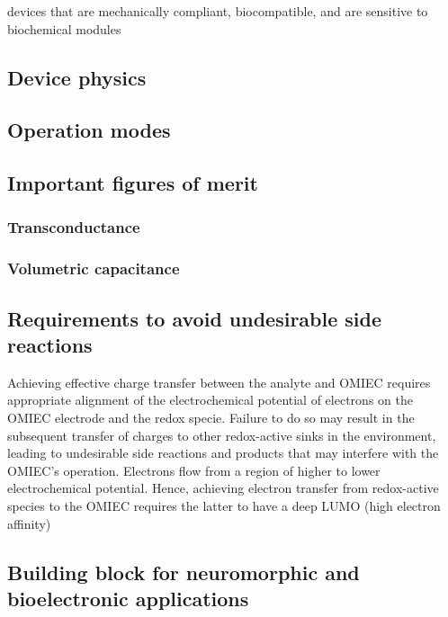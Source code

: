 devices that are mechanically compliant, biocompatible, and are sensitive to biochemical modules \cite{tan_organic_2022}

\subsection{Device physics}

\subsection{Operation modes}

\subsection{Important figures of merit}
\subsubsection{Transconductance}
\subsubsection{Volumetric capacitance}

\subsection{Requirements to avoid undesirable side reactions}
Achieving effective charge transfer between the analyte and OMIEC requires appropriate alignment of the electrochemical potential of electrons on the OMIEC electrode and the redox specie. Failure to do so may result in the subsequent transfer of charges to other redox-active sinks in the environment, leading to undesirable side reactions and products that may interfere with the OMIEC’s operation. Electrons flow from a region of higher to lower electrochemical potential. Hence, achieving electron transfer from redox-active species to the OMIEC requires the latter to have a deep LUMO (high electron affinity) \cite{tan_tuning_2022}


\subsection{Building block for neuromorphic and bioelectronic applications}


